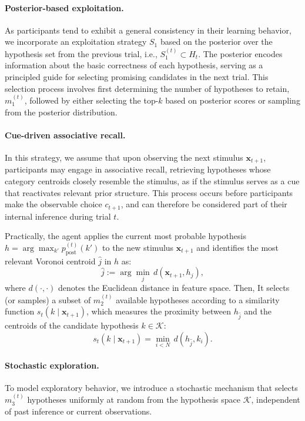 \paragraph{Posterior-based exploitation.} As participants tend to exhibit a general consistency in their learning behavior, we incorporate an exploitation strategy $S_1$ based on the posterior over the hypothesis set from the previous trial, i.e., $S_1^{(t)}\subset{H_{t}}$. The posterior encodes information about the basic correctness of each hypothesis, serving as a principled guide for selecting promising candidates in the next trial. This selection process involves first determining the number of hypotheses to retain, $m_1^{(t)}$, followed by either selecting the top-$k$ based on posterior scores or sampling from the posterior distribution.


\paragraph{Cue-driven associative recall.} In this strategy, we assume that upon observing the next stimulus $\mathbf x_{t+1}$, participants may engage in associative recall, retrieving hypotheses whose category centroids closely resemble the stimulus, as if the stimulus serves as a cue that reactivates relevant prior structure. This process occurs before participants make the observable choice $c_{t+1}$, and can therefore be considered part of their internal inference during trial $t$.

Practically, the agent applies the current most probable hypothesis $h = \arg\max_{k'} p_{\text{post}}^{(t)}(k')$ to the new stimulus $\mathbf{x}_{t+1}$ and identifies the most relevant Voronoi centroid $\hat{j}$ in $h$ as:
\begin{equation}
\hat{j} := \arg\min_{j} \, d\left( \mathbf{x}_{t+1}, h_j \right), \tag{5}
\end{equation}
where $d(\cdot, \cdot)$ denotes the Euclidean distance in feature space.
Then, It selects (or samples) a subset of $m_2^{(t)}$ available hypotheses according to a similarity function $s_t(k \mid \mathbf{x}_{t+1})$, which measures the proximity between $h_{\hat{j}}$ and the centroids of the candidate hypothesis $k\in \mathcal{K}$:
\begin{equation}
s_t(k \mid \mathbf{x}_{t+1}) = \min_{i < N} \, d(h_{\hat{j}}, k_i). \tag{6}
\end{equation}


\paragraph{Stochastic exploration.} 
To model exploratory behavior, we introduce a stochastic mechanism that selects $m_3^{(t)}$ hypotheses uniformly at random from the hypothesis space 
$\mathcal{K}$, independent of past inference or current observations.

